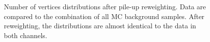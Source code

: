 \begin{figure}[hbtp]
  \centering
  \hspace{0.5cm}
  \caption{\label{fig:PUreweight}Number of vertices distributions after pile-up reweighting. Data are compared to the combination of all MC background samples. After reweighting, the distributions are almost identical to the data in both channels.}
\end{figure}



